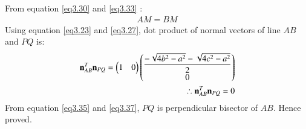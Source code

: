 \documentclass[journal,12pt,twocolumn]{IEEEtran}
\begin{document}
From equation \ref{eq3.30} and \ref{eq3.33} :
\begin{align}
    AM=BM \label{eq3.35}
\end{align}
Using equation \ref{eq3.23} and \ref{eq3.27}, dot product of normal vectors of line $AB$ and $PQ$ is:
\begin{align}
    \mathbf{n}_{AB}^T\mathbf{n}_{PQ}=\begin{pmatrix}1&0\end{pmatrix}\begin{pmatrix}\displaystyle \frac{-\sqrt{4b^2-a^2}-\sqrt{4c^2-a^2}}{2}\\0\end{pmatrix}\\
    \therefore \mathbf{n}_{AB}^T\mathbf{n}_{PQ}=0 \label{eq3.37}
\end{align}
From equation \ref{eq3.35} and \ref{eq3.37}, $PQ$ is perpendicular bisector of $AB$. Hence proved.
\end{document}
